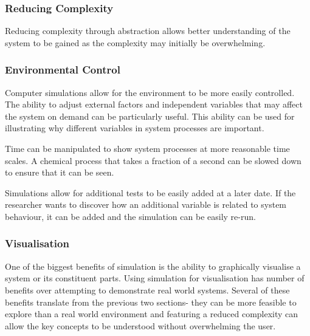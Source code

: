 \documentclass{UoYCSproject}
\begin{document}
\subsubsection{Reducing Complexity}
Reducing complexity through abstraction allows better understanding of the system to be gained as the complexity may initially be overwhelming.

\subsubsection{Environmental Control}
Computer simulations allow for the environment to be more easily controlled. The ability to adjust external factors and independent variables that may affect the system on demand can be particularly useful. This ability can be used for illustrating why different variables in system processes are important.

Time can be manipulated to show system processes at more reasonable time scales. A chemical process that takes a fraction of a second can be slowed down to ensure that it can be seen. 


Simulations allow for additional tests to be easily added at a later date. If the researcher wants to discover how an additional variable is related to system behaviour, it can be added and the simulation can be easily re-run.%


\subsubsection{Visualisation}
One of the biggest benefits of simulation is the ability to graphically visualise a system or its constituent parts. Using simulation for visualisation has number of benefits over attempting to demonstrate real world systems. Several of these benefits translate from the previous two sections- they can be more feasible to explore than a real world environment and featuring a reduced complexity can allow the key concepts to be understood without overwhelming the user.
\end{document}
